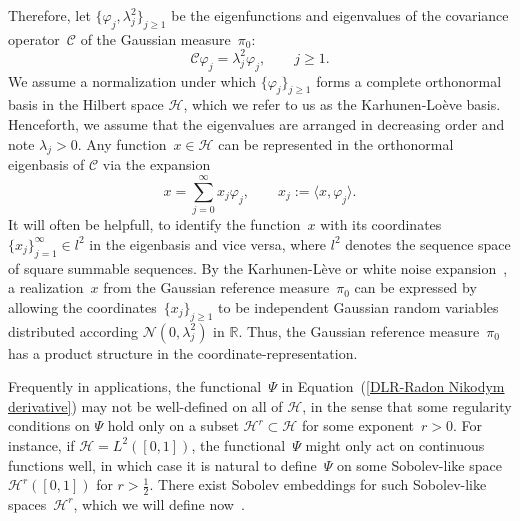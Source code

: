 Therefore, let $\{ \varphi_j, \lambda_j^2 \}_{j \geq 1}$ be the eigenfunctions and eigenvalues of the covariance operator~$\mathcal{C}$ of the Gaussian measure~$\pi_0$:
\begin{equation}
\label{DLR-Setting: Eigefunctions}
 \mathcal{C} \varphi_j = \lambda_j^2 \varphi_j, \qquad j \geq 1. 
\end{equation}
We assume a normalization under which $\{ \varphi_j \}_{j \geq 1}$ forms a complete orthonormal basis in the Hilbert space $\mathcal{H}$, which we refer to us as the Karhunen-Lo\`{e}ve basis. Henceforth, we assume that the eigenvalues are arranged in decreasing order and note $\lambda_j > 0$. Any function~$x \in \mathcal{H}$ can be represented in the orthonormal eigenbasis of $\mathcal{C}$ via the expansion
\begin{equation}
\label{DLR-Setting: karhunen-loeve representation}
 x = \sum_{j = 0}^{\infty} x_j \varphi_j, \qquad x_j := \langle x, \varphi_j \rangle.
\end{equation}
It will often be helpfull, to identify the function~$x$ with its coordinates~$\{ x_j \}_{j=1}^{\infty} \in l^2$ in the eigenbasis and vice versa, where $l^2$ denotes the sequence space of square summable sequences. By the Karhunen-L\`{e}ve or white noise expansion~\autocite[Section 2.2.3]{DaPrato1992}, a realization~$x$ from the Gaussian reference measure~$\pi_0$ can be expressed by allowing the coordinates~$\{x_j\}_{j \geq 1}$ to be independent Gaussian random variables distributed according $\mathcal{N}(0, \lambda_j^2)$ in $\mathbb{R}$. Thus, the Gaussian reference measure~$\pi_0$ has a product structure in the coordinate-representation.
\newline


Frequently in applications, the functional~$\Psi$ in Equation~(\ref{DLR-Radon Nikodym derivative}) may not be well-defined on all of $\mathcal{H}$, in the sense that some regularity conditions on $\Psi$ hold only on a subset $\mathcal{H}^r \subset \mathcal{H}$ for some exponent~$r > 0$. For instance, if $ \mathcal{H}= L^2([0,1]) $, the functional~$\Psi$ might only act on continuous functions well, in which case it is natural to define~$\Psi$ on some Sobolev-like space~$\mathcal{H}^r([0,1])$ for $r > \tfrac{1}{2}$. There exist Sobolev embeddings for such Sobolev-like spaces~$\mathcal{H}^r$, which we will define now~\autocite[Theorem 6.3]{Hairer2009}.


